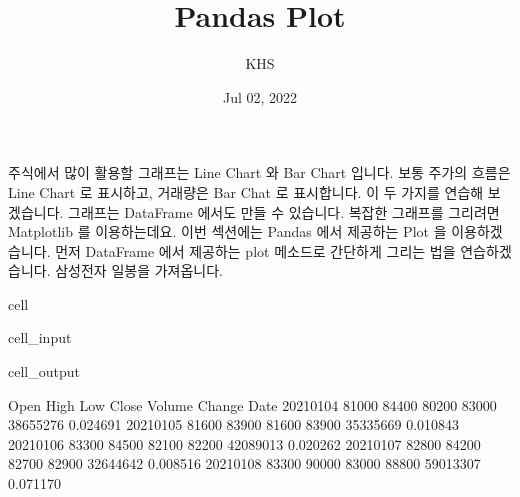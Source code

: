 \documentclass[letterpaper,10pt,english]{jupyterBook}
\title{Pandas Plot}
\date{Jul 02, 2022}
\author{KHS}
\begin{document}
\pagestyle{empty}
\sphinxmaketitle
\pagestyle{plain}
\sphinxtableofcontents
\pagestyle{normal}
\label{\detokenize{chapter2/2.3.1_Visualization::doc}}


\sphinxAtStartPar
주식에서 많이 활용할 그래프는 Line Chart 와 Bar Chart 입니다. 보통 주가의 흐름은 Line Chart 로 표시하고, 거래량은 Bar Chat 로 표시합니다. 이 두 가지를 연습해 보겠습니다. 그래프는 DataFrame 에서도 만들 수 있습니다. 복잡한 그래프를 그리려면 Matplotlib 를 이용하는데요. 이번 섹션에는 Pandas 에서 제공하는 Plot 을 이용하겠습니다. 먼저 DataFrame 에서 제공하는 plot 메소드로 간단하게 그리는 법을 연습하겠습니다. 삼성전자 일봉을 가져옵니다.

\begin{sphinxuseclass}{cell}\begin{sphinxVerbatimInput}

\begin{sphinxuseclass}{cell_input}
\begin{sphinxVerbatim}[commandchars=\\\{\}]
    
   

   
     

\end{sphinxVerbatim}

\end{sphinxuseclass}\end{sphinxVerbatimInput}
\begin{sphinxVerbatimOutput}

\begin{sphinxuseclass}{cell_output}
\begin{sphinxVerbatim}[commandchars=\\\{\}]
             Open   High    Low  Close    Volume    Change
Date                                                      
2021\PYGZhy{}01\PYGZhy{}04  81000  84400  80200  83000  38655276  0.024691
2021\PYGZhy{}01\PYGZhy{}05  81600  83900  81600  83900  35335669  0.010843
2021\PYGZhy{}01\PYGZhy{}06  83300  84500  82100  82200  42089013 \PYGZhy{}0.020262
2021\PYGZhy{}01\PYGZhy{}07  82800  84200  82700  82900  32644642  0.008516
2021\PYGZhy{}01\PYGZhy{}08  83300  90000  83000  88800  59013307  0.071170
\end{sphinxVerbatim}


\end{sphinxuseclass}
\end{sphinxVerbatimOutput}
\end{sphinxuseclass}
\end{document}
